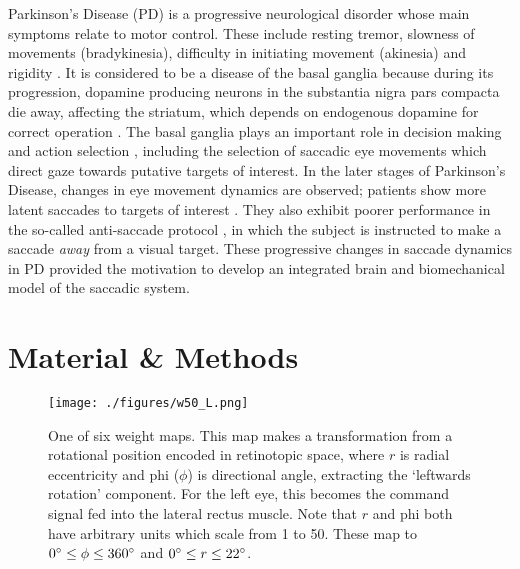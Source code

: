 \documentclass[11pt, a4paper]{article}
\newcommand{\e}{\emph}
\newcommand{\mycite}[1]{\cite{#1}}
\begin{document}
Parkinson's Disease (PD) is a progressive neurological disorder whose
main symptoms relate to motor control. These include resting tremor,
slowness of movements (bradykinesia), difficulty in initiating
movement (akinesia) and
rigidity \mycite{galvan_pathophysiology_2008}. It is considered to be
a disease of the basal ganglia because during its progression,
dopamine producing neurons in the substantia nigra pars compacta die
away, affecting the striatum, which depends on endogenous dopamine for
correct operation \mycite{javoy-agid_is_1980}. The basal ganglia plays
an important role in decision making and action
selection \mycite{schultz_reward_2000}, including the selection of
saccadic eye movements
\mycite{hikosaka_role_2000} which direct gaze towards putative targets
of interest. In the later stages of Parkinson's Disease, changes in
eye movement dynamics are observed; patients show more latent saccades
to targets of interest \mycite{chambers_response_2010}. They also
exhibit poorer performance \mycite{kitagawa_relationship_1994} in the
so-called anti-saccade protocol \mycite{munoz_look_2004}, in which the
subject is instructed to make a saccade \e{away} from a visual
target. These progressive changes in saccade dynamics in PD provided
the motivation to develop an integrated brain and biomechanical model
of the saccadic system.




\section{Material \& Methods}

\begin{wrapfigure}{r}{0.4\textwidth}
\texttt{[image: ./figures/w50\_L.png]}
\caption{One of six weight maps. This map makes a transformation from
a rotational position encoded in retinotopic space, where $r$ is
radial eccentricity and phi ($\phi$) is directional angle, extracting
the `leftwards rotation' component. For the left eye, this becomes
the command signal fed into the lateral rectus muscle. Note that $r$
and phi both have arbitrary units which scale from 1 to 50. These map
to $0\degree \leq \phi \leq 360\degree$ and $0\degree \leq r \leq
22\degree$.}
\vspace{-5pt}
\label{left_map}
\end{wrapfigure}
\end{document}
